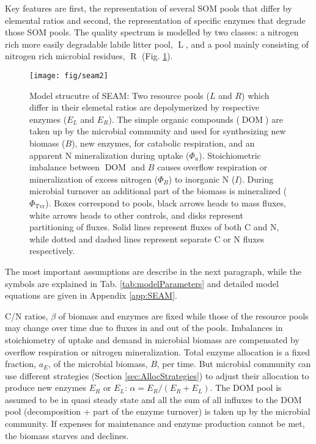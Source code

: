 Key features are first, the representation of several SOM pools that differ by
elemental ratios and second, the representation of specific enzymes
that degrade those SOM pools. The quality spectrum is modelled by two
classes: a nitrogen rich more easily degradable labile litter pool,
$\operatorname{L}$, and a pool mainly consisting of nitrogen rich microbial
residues, $\operatorname{R}$ (Fig. \ref{fig:SEAM}).

\begin{figure}[t] \vspace*{2mm}
\label{fig:SEAM}
\begin{center}
\texttt{[image: fig/seam2]}
\end{center}
\caption{Model strucutre of SEAM: Two resource pools ($L$ and $R$) which differ
in their elemetal ratios are
depolymerized by respective enzymes ($E_L$ and $E_R$). The simple organic
compounds ($\operatorname{DOM}$) are taken up
by the microbial community  and used for synthesizing
new biomass (${B}$), new enzymes, for catabolic respiration, and an apparent
N mineralization during uptake ($\Phi_u$). Stoichiometric imbalance
between $\operatorname{DOM}$ and ${B}$ causes overflow respiration 
or mineralization of excess nitrogen ($\Phi_B$) to inorganic N ($I$).
During microbial turnover an additional part of the biomass is mineralized
($\Phi_{\operatorname{Tvr}}$).
Boxes correspond to pools, black
arrows heads to mass fluxes, white arrows heads to other controls, and disks
represent partitioning of fluxes. Solid lines represent fluxes of both C and N, while
dotted and dashed lines represent separate C or N fluxes respectively.}
\end{figure}

The most important assumptions are describe in the next paragraph, while
the symbols are explained in Tab. \ref{tab:modelParameters} and detailed model equations are
given in Appendix \ref{app:SEAM}.

 

C/N ratios, $\beta$ of biomass and enzymes are
fixed while those of the resource pools may change over time due to
fluxes in and out of the pools. Imbalances in stoichiometry of uptake and demand
in microbial biomass are compensated by overflow respiration or nitrogen
mineralization.
Total enzyme allocation is a fixed fraction, $a_E$, of the microbial biomass,
$B$, per time. But microbial community can use different strategies
(Section \ref{sec:AllocStrategies}) to adjust their allocation to produce new
enzymes $E_R$ or $E_L$: $\alpha = E_R / (E_R + E_L)$. 
The DOM pool is assumed to be in quasi steady state and all the sum of all
influxes to the DOM pool (decomposition + part of the enzyme turnover) is taken
up by the microbial community. If expenses for maintenance and enzyme production
cannot be met, the biomass starves and declines.

